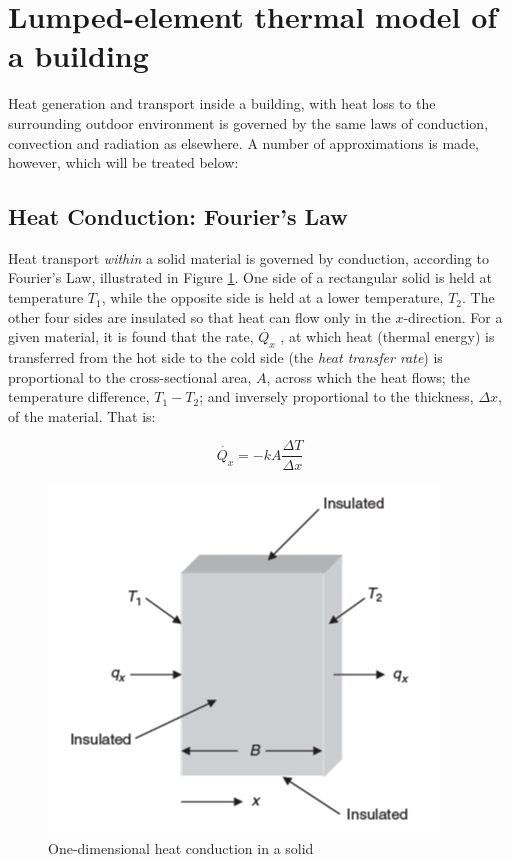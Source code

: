 \section{Lumped-element thermal model of a building}

Heat generation and transport inside a building, with heat loss to the surrounding outdoor environment is governed by the same laws of conduction, convection and radiation as elsewhere. A number of approximations is made, however, which will be treated below:

\subsection{Heat Conduction: Fourier's Law}

Heat transport \emph{within} a solid material is governed by conduction, according to Fourier's Law, illustrated in Figure \ref{fig:heatcond_1d}.
One side of a rectangular solid is held at temperature $T_1$, while the opposite side is held at a lower temperature, $T_2$. The other four sides are insulated so that heat can flow only in the $x$-direction. For a given material, it is found that the rate, $\dot{Q_x}$ , at which heat (thermal
energy) is transferred from the hot side to the cold side (the \emph{heat transfer rate}) is proportional to the cross-sectional area, $A$, across which the heat flows; the temperature difference, $T_1 - T_2$; and inversely proportional to
the thickness, $\Delta x$, of the material. That is:

\begin{equation}
	\label{eq:fourierlaw}
	\dot{Q_x} = - kA \frac{\Delta T}{\Delta x}
\end{equation}

\begin{figure}[H]
	\centering
	\includegraphics[width=0.5\columnwidth]{Pictures/heat_conduction_1d.png}
	\caption[Short title]{One-dimensional heat conduction in a solid}
	\label{fig:heatcond_1d}
\end{figure} 

